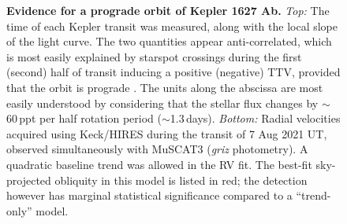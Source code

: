 \documentclass[12pt,modern,twocolumn,tighten]{aastex63}
\begin{document}
\begin{figure}[tp]
	\begin{center}
		\leavevmode
		
	\end{center}
	\vspace{-0.7cm}
	\caption{
		{\bf Evidence for a prograde orbit of Kepler 1627 Ab.}
    {\it Top:} 
    The time of each Kepler transit was measured, along with the local
    slope of the light curve.  The two quantities appear
    anti-correlated, which is most easily explained by starspot
    crossings during the first (second) half of transit inducing a
    positive (negative) TTV, provided that the orbit is prograde
    \citep{mazeh_time_2015}.  The units along the abscissa are most
    easily understood by considering that the stellar flux
    changes by $\sim$60\,ppt per half rotation period
    ($\sim$1.3\,days).
    {\it Bottom:} Radial velocities acquired using Keck/HIRES during
    the transit of 7 Aug 2021 UT, observed simultaneously with MuSCAT3
    ({\it griz} photometry).  A quadratic baseline trend was allowed
    in the RV fit.  The best-fit sky-projected obliquity in this model
    is listed in red; the detection however has marginal statistical
    significance compared to a ``trend-only'' model.
    \label{fig:obliquity}
	}
\end{figure}
\end{document}
